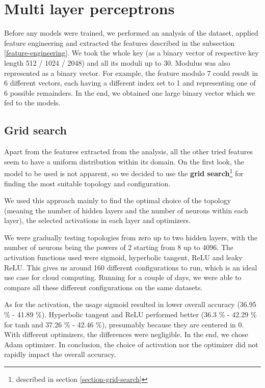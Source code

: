 \section{Multi layer perceptrons}

Before any models were trained, we performed an analysis of the dataset, applied feature engineering and extracted the features described in the subsection \ref{feature-engineering}. We took the whole key (as a binary vector of respective key length 512 / 1024 / 2048) and all its moduli up to 30. Modulus was also represented as a binary vector. For example, the feature modulo 7 could result in 6 different vectors, each having a different index set to 1 and representing one of 6 possible remainders. In the end, we obtained one large binary vector which we fed to the models.

\subsection*{Grid search}

Apart from the features extracted from the analysis, all the other tried features seem to have a uniform distribution within its domain. On the first look, the model to be used is not apparent, so we decided to use the \textbf{grid search}\footnote{described in section \ref{section-grid-search}} for finding the most suitable topology and configuration. 

We used this approach mainly to find the optimal choice of the topology (meaning the number of hidden layers and the number of neurons within each layer), the selected activations in each layer and optimizers.

We were gradually testing topologies from zero up to two hidden layers, with the number of neurons being the powers of 2 starting from 8 up to 4096. The activation functions used were sigmoid, hyperbolic tangent, ReLU and leaky ReLU. This gives us around 160 different configurations to run, which is an ideal use case for cloud computing. Running for a couple of days, we were able to compare all these different configurations on the same datasets.

As for the activation, the usage sigmoid resulted in lower overall accuracy (36.95 \% - 41.89 \%). Hyperbolic tangent and ReLU performed better (36.3 \% - 42.29 \% for tanh and 37.26 \% - 42.46 \%), presumably because they are centered in 0. With different optimizers, the differences were negligible. In the end, we chose Adam optimizer. In conclusion, the choice of activation nor the optimizer did not rapidly impact the overall accuracy. 

